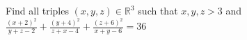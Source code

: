 Find all triples $(x,y,z)\in \mathbb{R}^{3}$ such that $x,y,z>3$ and $\frac{(x+2)^2}{y+z-2}+\frac{(y+4)^2}{z+x-4}+\frac{(z+6)^2}{x+y-6}=36$
